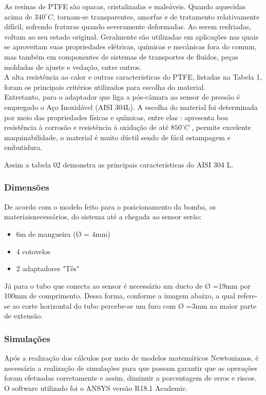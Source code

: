 As resinas de PTFE são opacas, cristalizadas e maleáveis. Quando aquecidas acima de $340^{\circ}C$, tornam-se transparentes, amorfas e de tratamento relativamente difícil, sofrendo fraturas quando severamente deformadas. Ao serem resfriadas, voltam ao seu estado original. Geralmente são utilizadas em aplicações nas quais se aproveitam suas propriedades elétricas, químicas e mecânicas fora do comum, mas também em componentes de sistemas de transportes de fluidos, peças moldadas de ajuste e vedação, entre outros.\\

A alta resistência ao calor e outras características do PTFE, listadas na Tabela 1, foram os principais critérios utilizados para escolha do material.\\



Entretanto, para o adaptador que liga a pós-câmara ao sensor de pressão é empregado o Aço Inoxidável (AISI 304L). A escolha do material foi determinada por meio das propriedades físicas e químicas, entre elas : apresenta boa resistência à corrosão e resistência à oxidação de até $850^{\circ}C$ , permite excelente maquinabilidade, o material é muito dúctil sendo de fácil estampagem e  embutidura.

Assim a tabela 02 demonstra as principais características do AISI 304 L.


\subsubsection{Dimensões}
De acordo com o modelo feito para o posicionamento da bomba, os materiaisnecessários, do sistema até a chegada ao sensor serão:
\begin{itemize}
\item 6m de mangueira (Ø = 4mm)
\item 4 cotovelos
\item 2 adaptadores "Tês"
\end{itemize}

Já para o tubo que conecta ao sensor é necessário um ducto de Ø =19mm por 100mm de comprimento. Dessa forma, conforme a imagem abaixo, a qual refere-se ao corte horizontal do tubo percebe-se um furo com Ø =3mm na maior parte de extensão.


\subsubsection{Simulações}
Após a realização dos cálculos por meio de modelos matemáticos Newtonianos, é necessária a realização de simulações para que possam garantir que as operações foram efetuadas corretamente e assim, diminuir a porcentagem de erros e riscos. O software utilizado foi o ANSYS versão R18.1 Academic.

